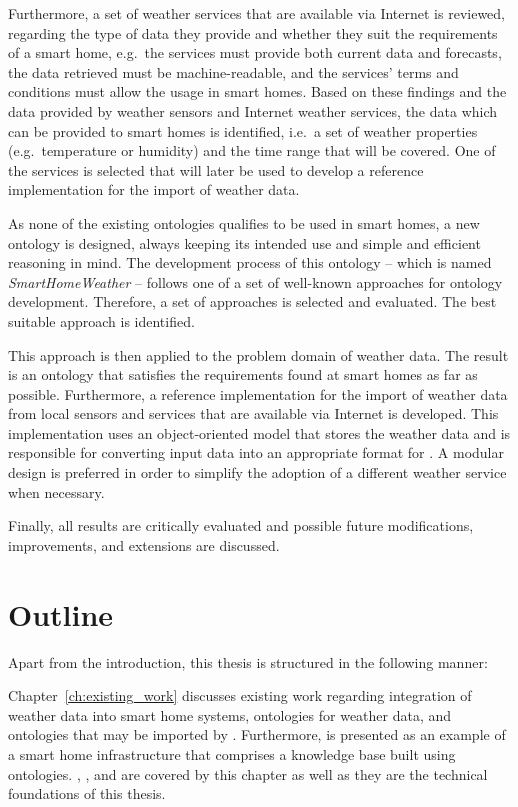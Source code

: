 Furthermore, a set of weather services that are available via Internet is reviewed, regarding the type of data they provide and whether they suit the requirements of a smart home, e.g.\ the services must provide both current data and forecasts, the data retrieved must be machine-readable, and the services' terms and conditions must allow the usage in smart homes. Based on these findings and the data provided by weather sensors and Internet weather services, the data which can be provided to smart homes is identified, i.e.\ a set of weather properties (e.g.\ temperature or humidity) and the time range that will be covered. One of the services is selected that will later be used to develop a reference implementation for the import of weather data.

As none of the existing ontologies qualifies to be used in smart homes, a new  ontology is designed, always keeping its intended use and simple and efficient reasoning in mind. The development process of this ontology -- which is named \emph{SmartHomeWeather} -- follows one of a set of well-known approaches for ontology development. Therefore, a set of approaches is selected and evaluated. The best suitable approach is identified.

This approach is then applied to the problem domain of weather data. The result is an ontology that satisfies the requirements found at smart homes as far as possible. Furthermore, a reference implementation for the import of weather data from local sensors and services that are available via Internet is developed. This implementation uses an object-oriented model that stores the weather data and is responsible for converting input data into an appropriate format for \smarthomeweather. A modular design is preferred in order to simplify the adoption of a different weather service when necessary.

Finally, all results are critically evaluated and possible future modifications, improvements, and extensions are discussed.

\section{Outline}

Apart from the introduction, this thesis is structured in the following manner:

Chapter~\ref{ch:existing_work} discusses existing work regarding integration of weather data into smart home systems, ontologies for weather data, and ontologies that may be imported by \smarthomeweather. Furthermore, \thinkhome is presented as an example of a smart home infrastructure that comprises a knowledge base built using ontologies. , , and  are covered by this chapter as well as they are the technical foundations of this thesis.

